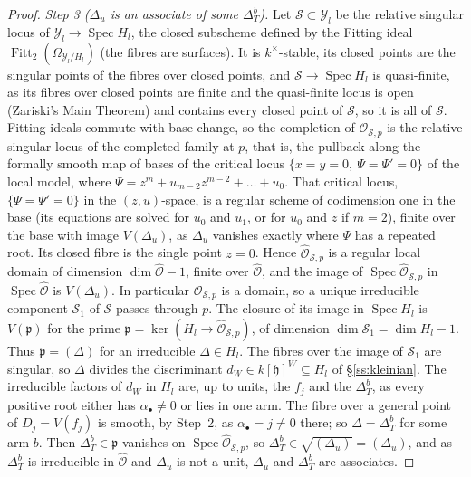 \documentclass[11pt]{amsart}
\numberwithin{table}{section}
\numberwithin{figure}{section}
\numberwithin{equation}{section}
\theoremstyle{definition}
\theoremstyle{plain}
\newcommand{\cO}{\mathcal{O}}
\newcommand{\cY}{\mathcal{Y}}
\newcommand{\h}{\mathfrak{h}}
\newcommand{\bul}{\bullet}
\DeclareMathOperator{\Spec}{Spec}
\begin{document}
\begin{proof}
\emph{Step 3 ($\Delta_u$ is an associate of some $\Delta_T^b$).} Let $\mathscr S \subset \cY_l$ be the relative singular locus of $\cY_l \to \Spec H_l$, the closed subscheme defined by the Fitting ideal $\operatorname{Fitt}_2(\Omega_{\cY_l/H_l})$ (the fibres are surfaces). It is $k^\times$-stable, its closed points are the singular points of the fibres over closed points, and $\mathscr S \to \Spec H_l$ is quasi-finite, as its fibres over closed points are finite and the quasi-finite locus is open (Zariski's Main Theorem) and contains every closed point of $\mathscr S$, so it is all of $\mathscr S$. Fitting ideals commute with base change, so the completion of $\cO_{\mathscr S,p}$ is the relative singular locus of the completed family at $p$, that is, the pullback along the formally smooth map of bases of the critical locus $\{x = y = 0,\ \Psi = \Psi' = 0\}$ of the local model, where $\Psi = z^m + u_{m-2}z^{m-2} + \dots + u_0$. That critical locus, $\{\Psi = \Psi' = 0\}$ in the $(z, u)$-space, is a regular scheme of codimension one in the base (its equations are solved for $u_0$ and $u_1$, or for $u_0$ and $z$ if $m = 2$), finite over the base with image $V(\Delta_u)$, as $\Delta_u$ vanishes exactly where $\Psi$ has a repeated root. Its closed fibre is the single point $z = 0$. Hence $\widehat{\cO}_{\mathscr S,p}$ is a regular local domain of dimension $\dim \widehat{\mathcal O} - 1$, finite over $\widehat{\mathcal O}$, and the image of $\Spec \widehat{\cO}_{\mathscr S,p}$ in $\Spec \widehat{\mathcal O}$ is $V(\Delta_u)$. In particular $\cO_{\mathscr S,p}$ is a domain, so a unique irreducible component $\mathscr S_1$ of $\mathscr S$ passes through $p$. The closure of its image in $\Spec H_l$ is $V(\mathfrak p)$ for the prime $\mathfrak p = \ker(H_l \to \widehat{\cO}_{\mathscr S,p})$, of dimension $\dim \mathscr S_1 = \dim H_l - 1$. Thus $\mathfrak p = (\Delta)$ for an irreducible $\Delta \in H_l$. The fibres over the image of $\mathscr S_1$ are singular, so $\Delta$ divides the discriminant $d_W \in k[\h]^W \subseteq H_l$ of \S\ref{ss:kleinian}. The irreducible factors of $d_W$ in $H_l$ are, up to units, the $f_j$ and the $\Delta_T^b$, as every positive root either has $\alpha_\bul \neq 0$ or lies in one arm. The fibre over a general point of $D_j = V(f_j)$ is smooth, by Step~2, as $\alpha_\bul = j \neq 0$ there; so $\Delta = \Delta_T^b$ for some arm $b$. Then $\Delta_T^b \in \mathfrak p$ vanishes on $\Spec \widehat{\cO}_{\mathscr S,p}$, so $\Delta_T^b \in \sqrt{(\Delta_u)} = (\Delta_u)$, and as $\Delta_T^b$ is irreducible in $\widehat{\mathcal O}$ and $\Delta_u$ is not a unit, $\Delta_u$ and $\Delta_T^b$ are associates.


\end{proof}
\end{document}
